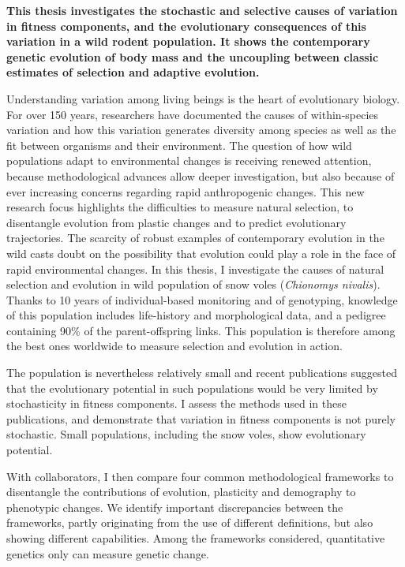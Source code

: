 \begin{summary}
\textbf{
This thesis investigates the stochastic and selective causes of variation in fitness components, and the evolutionary consequences of this variation in a wild rodent population. 
It shows the contemporary genetic evolution of body mass and the uncoupling between classic estimates of selection and adaptive evolution. 
}

Understanding variation among living beings is the heart of evolutionary biology. For over 150 years, researchers have documented the causes of within-species variation and how this variation generates diversity among species as well as the fit between organisms and their environment. The question of how wild populations adapt to environmental changes is receiving renewed attention, because methodological advances allow deeper investigation, but also because of ever increasing concerns regarding rapid anthropogenic changes. This new research focus highlights the difficulties to measure natural selection, to disentangle evolution from plastic changes and to predict evolutionary trajectories. The scarcity of robust examples of contemporary evolution in the wild casts doubt on the possibility that evolution could play a role in the face of rapid environmental changes.
In this thesis, I investigate the causes of natural selection and evolution in wild population of snow voles (\textit{Chionomys nivalis}). Thanks to 10 years of individual-based monitoring and of genotyping, knowledge of this population includes life-history and morphological data, and a pedigree containing 90\% of the parent-offspring links. This population is therefore among the best ones worldwide to measure selection and evolution in action. 

The population is nevertheless relatively small and recent publications suggested that the evolutionary potential in such populations would be very limited by stochasticity in fitness components. I assess the methods used in these publications, and demonstrate that variation in fitness components is not purely stochastic. Small populations, including the snow voles, show evolutionary potential. 
 
With collaborators, I then compare four common methodological frameworks to disentangle the contributions of evolution, plasticity and demography to phenotypic changes. We identify important discrepancies between the frameworks, partly originating from the use of different definitions, but also showing different capabilities. Among the frameworks considered, quantitative genetics only can measure genetic change.


\end{summary}
